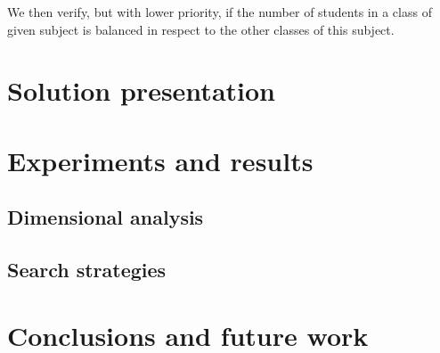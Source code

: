 \documentclass[runningheads]{llncs}
\begin{document}
We then verify, but with lower priority, if the number of students in a class of given subject is balanced in respect to the other classes of this subject.

\section{Solution presentation}

\section{Experiments and results}

\subsection{Dimensional analysis}

\subsection{Search strategies}

\section{Conclusions and future work}

%
%



\end{document}
